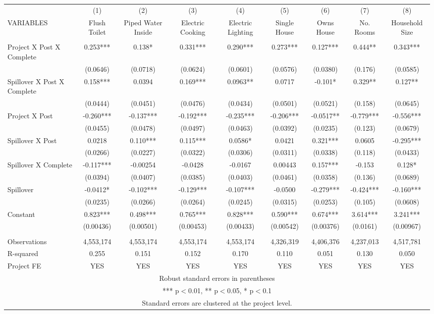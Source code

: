 \begin{tabular}{lcccccccc} \hline
 & (1) & (2) & (3) & (4) & (5) & (6) & (7) & (8) \\
VARIABLES & Flush Toilet & Piped Water Inside & Electric Cooking & Electric Lighting & Single House & Owns House & No. Rooms & Household Size \\ \hline
 &  &  &  &  &  &  &  &  \\
Project X Post X Complete & 0.253*** & 0.138* & 0.331*** & 0.290*** & 0.273*** & 0.127*** & 0.444** & 0.343*** \\
 & (0.0646) & (0.0718) & (0.0624) & (0.0601) & (0.0576) & (0.0380) & (0.176) & (0.0585) \\
Spillover X Post X Complete & 0.158*** & 0.0394 & 0.169*** & 0.0963** & 0.0717 & -0.101* & 0.329** & 0.127** \\
 & (0.0444) & (0.0451) & (0.0476) & (0.0434) & (0.0501) & (0.0521) & (0.158) & (0.0645) \\
Project X Post & -0.260*** & -0.137*** & -0.192*** & -0.235*** & -0.206*** & -0.0517** & -0.779*** & -0.556*** \\
 & (0.0455) & (0.0478) & (0.0497) & (0.0463) & (0.0392) & (0.0235) & (0.123) & (0.0679) \\
Spillover X Post & 0.0218 & 0.110*** & 0.115*** & 0.0586* & 0.0421 & 0.321*** & 0.0605 & -0.295*** \\
 & (0.0266) & (0.0227) & (0.0322) & (0.0306) & (0.0311) & (0.0338) & (0.118) & (0.0433) \\
Spillover X Complete & -0.117*** & -0.00254 & -0.0428 & -0.0167 & 0.00443 & 0.157*** & -0.153 & 0.128* \\
 & (0.0394) & (0.0407) & (0.0385) & (0.0403) & (0.0461) & (0.0358) & (0.136) & (0.0689) \\
Spillover & -0.0412* & -0.102*** & -0.129*** & -0.107*** & -0.0500 & -0.279*** & -0.424*** & -0.160*** \\
 & (0.0235) & (0.0266) & (0.0264) & (0.0245) & (0.0315) & (0.0253) & (0.105) & (0.0608) \\
Constant & 0.823*** & 0.498*** & 0.765*** & 0.828*** & 0.590*** & 0.674*** & 3.614*** & 3.241*** \\
 & (0.00436) & (0.00501) & (0.00453) & (0.00433) & (0.00542) & (0.00376) & (0.0161) & (0.00967) \\
 &  &  &  &  &  &  &  &  \\
Observations & 4,553,174 & 4,553,174 & 4,553,174 & 4,553,174 & 4,326,319 & 4,406,376 & 4,237,013 & 4,517,781 \\
R-squared & 0.255 & 0.151 & 0.152 & 0.170 & 0.110 & 0.051 & 0.130 & 0.050 \\
 Project FE & YES & YES & YES & YES & YES & YES & YES & YES \\ \hline
\multicolumn{9}{c}{ Robust standard errors in parentheses} \\
\multicolumn{9}{c}{ *** p$<$0.01, ** p$<$0.05, * p$<$0.1} \\
\multicolumn{9}{c}{ Standard errors are clustered at the project level.} \\
\end{tabular}
